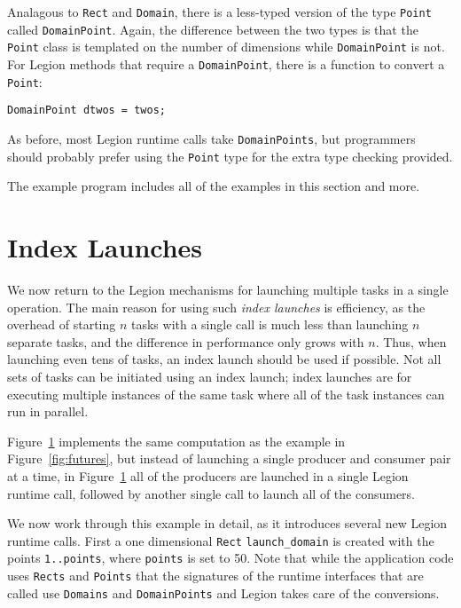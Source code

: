 Analagous to {\tt Rect} and {\tt Domain}, there is a less-typed version of the type {\tt Point} called {\tt DomainPoint}.
Again, the difference between the two types is that the {\tt Point} class is templated on the number of dimensions 
while {\tt DomainPoint} is not.  For Legion methods that require a {\tt DomainPoint}, there is a function to convert a
{\tt Point}:
\begin{verbatim}
DomainPoint dtwos = twos;
\end{verbatim}
As before, most Legion runtime calls take {\tt DomainPoints}, but programmers should probably prefer using the {\tt Point} type
for the extra type checking provided.

The example program  includes all of the examples in this section and more.

\section{Index Launches}
\label{sec:indexlaunch}

We now return to the Legion mechanisms for launching multiple tasks in a
single operation.  The main reason for using such {\em index launches}
is efficiency, as the overhead of starting $n$ tasks with a single
call is much less than launching $n$ separate tasks, and the
difference in performance only grows with $n$.  Thus, when launching
even tens of tasks, an index launch should be used if possible.  Not
all sets of tasks can be initiated using an index launch; 
index launches are for executing multiple instances of the same task
where all of the task instances can run in parallel.

\begin{figure}
{\small
}
\caption{}
\label{fig:indexlaunch}
\end{figure}


Figure~\ref{fig:indexlaunch} implements the same computation as the example in
Figure~\ref{fig:futures}, but instead of launching a single
producer and consumer pair at a time, in Figure~\ref{fig:indexlaunch}
all of the producers are launched in a single Legion runtime call,
followed by another single call to launch all of the consumers.

We now work through this example in detail, as it introduces several
new Legion runtime calls.  First a one dimensional {\tt Rect} 
{\tt launch\_domain} is created with the points {\tt 1..points}, where
{\tt points} is set to 50.  Note that while the application code uses {\tt Rects} and {\tt Points} that the signatures of the runtime interfaces that are called use {\tt Domains} and {\tt DomainPoints} and Legion takes care of the conversions.

